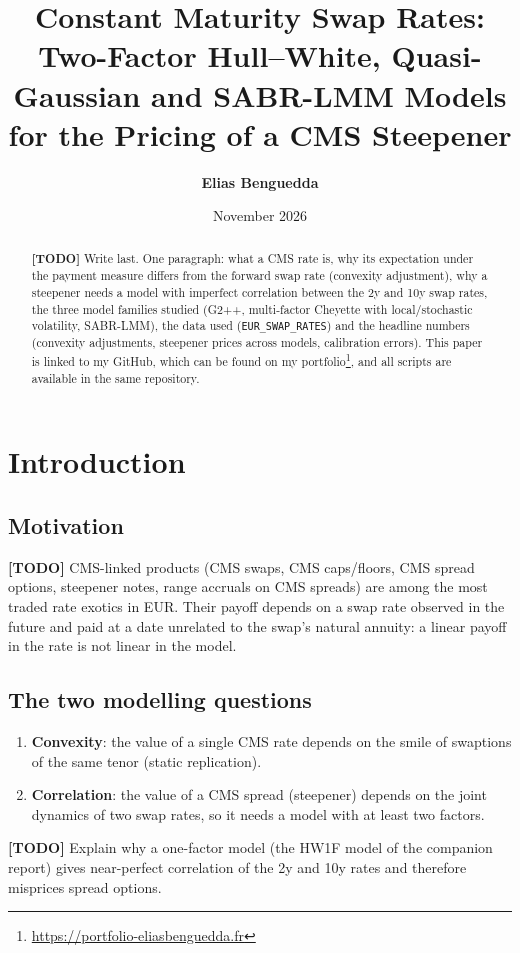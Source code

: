 \documentclass[11pt,a4paper]{article}
\title{\textbf{Constant Maturity Swap Rates:\\
Two-Factor Hull--White, Quasi-Gaussian and SABR-LMM Models\\
for the Pricing of a CMS Steepener}}
\author{\textbf{Elias Benguedda}}
\date{November 2026}
\theoremstyle{plain}
\theoremstyle{definition}
\newcommand{\todo}[1]{\textcolor{red!70!black}{\textbf{[TODO]} #1}}
\begin{document}
\maketitle

\begin{abstract}
\todo{Write last. One paragraph: what a CMS rate is, why its expectation under the payment measure differs from the forward swap rate (convexity adjustment), why a steepener needs a model with imperfect correlation between the 2y and 10y swap rates, the three model families studied (G2++, multi-factor Cheyette with local/stochastic volatility, SABR-LMM), the data used (\texttt{EUR\_SWAP\_RATES}) and the headline numbers (convexity adjustments, steepener prices across models, calibration errors).} This paper is linked to my GitHub, which can be found on my portfolio\footnote{\url{https://portfolio-eliasbenguedda.fr}}, and all scripts are available in the same repository.
\end{abstract}

\clearpage

\tableofcontents
\newpage

\section{Introduction}
\label{sec:intro}

\subsection{Motivation}
\todo{CMS-linked products (CMS swaps, CMS caps/floors, CMS spread options, steepener notes, range accruals on CMS spreads) are among the most traded rate exotics in EUR. Their payoff depends on a swap rate observed in the future and paid at a date unrelated to the swap's natural annuity: a linear payoff in the rate is not linear in the model.}

\subsection{The two modelling questions}
\begin{enumerate}
    \item \textbf{Convexity}: the value of a single CMS rate depends on the smile of swaptions of the same tenor (static replication).
    \item \textbf{Correlation}: the value of a CMS spread (steepener) depends on the joint dynamics of two swap rates, so it needs a model with at least two factors.
\end{enumerate}
\todo{Explain why a one-factor model (the HW1F model of the companion report) gives near-perfect correlation of the 2y and 10y rates and therefore misprices spread options.}
\end{document}
